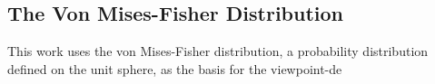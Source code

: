 \subsection{The Von Mises-Fisher Distribution}

This work uses the von Mises-Fisher distribution, a probability distribution defined on the unit sphere, as the basis for the viewpoint-de